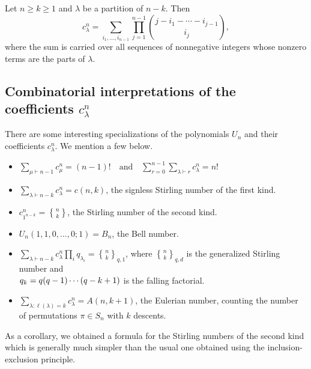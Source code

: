 \documentclass{commat}
\newcommand\q{\quad}
\newcommand\ds{\displaystyle}
\begin{document}
\begin{corollary}\label{C:closed:form:d:is:1}
	Let $n\geq k \geq 1$ and $\lambda$ be a partition of $n-k$. Then 
	\begin{equation*}%
		c^n_\lambda =\sum_{i_1, \ldots, i_{n-1}}
		\prod_{j=1}^{n-1}
		\genfrac{(}{)}{0pt}{}{j-i_{1}-\cdots -i_{j-1}}{i_j},
	\end{equation*} 
	where the sum is carried over all sequences of nonnegative integers whose nonzero terms are the parts of $\lambda$.
\end{corollary}

\subsection{Combinatorial interpretations of the coefficients \texorpdfstring{$c_{\lambda}^n$}{cλn}}\label{S:comb:special}

There are some interesting specializations of the polynomials $U_n$ and their coefficients $c_{\lambda}^n$. We mention a few below.

\begin{itemize}
	\item $\ds \sum_{\mu \vdash n-1} c_{\mu}^n  =  (n-1)! \q \text{and} \q
	\sum_{r=0}^{n-1} \sum_{\lambda \vdash r}  c_\lambda^n    =  n!$
	\item $\ds \sum_{\lambda\vdash n-k}c^n_\lambda=c(n, k)$, the signless Stirling number of the first kind.
	\item $\ds c^n_{1^{n-k}}=%
	\genfrac{\{}{\}}{0pt}{}{n}{k}$, the Stirling number of the second kind.
	\item $\ds U_n(1, 1, 0, \ldots, 0;1)=B_n$, the Bell number.
	\item $\ds \sum_{\lambda\vdash n-k} c_{\lambda}^{n} \prod_i q_{\lambda_i}=%
	\genfrac{\{}{\}}{0pt}{}{n}{k}_{q,1}$, where %
	$\genfrac{\{}{\}}{0pt}{}{n}{k}_{q,d}$ is the generalized Stirling number and \\ $q_k=\nolinebreak q(q-1)\cdots (q-k+1)$ is the falling factorial.
	\item $\ds \sum_{\lambda: \ell(\lambda)=k} c_{\lambda}^n =A(n, k+1)$, the Eulerian number, counting the number of permutations $\pi\in S_n$ with $k$ descents.
\end{itemize}

As a corollary, we obtained a formula for the Stirling numbers of the second kind which is generally much simpler than the usual one obtained using the inclusion-exclusion principle.
\end{document}
